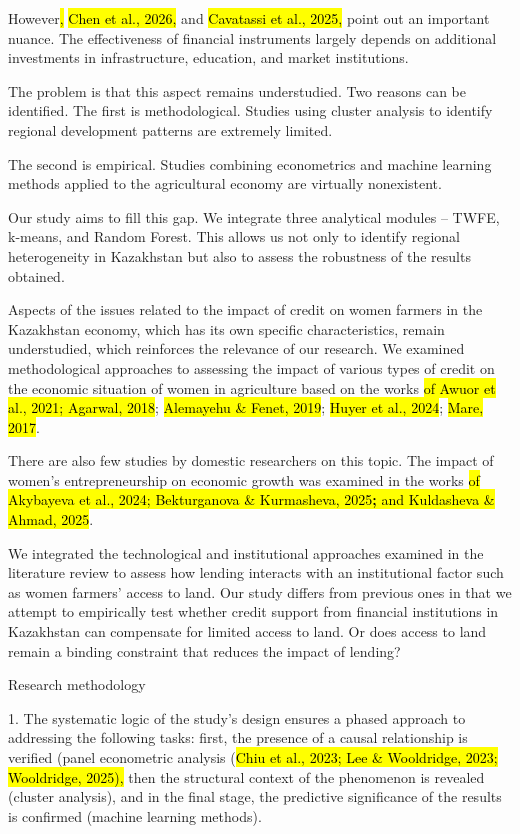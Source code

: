 However\hl{,} \hl{Chen et al., 2026,} and \hl{Cavatassi et al., 2025,}
point out an important nuance. The effectiveness of financial
instruments largely depends on additional investments in infrastructure,
education, and market institutions.

The problem is that this aspect remains understudied. Two reasons can be
identified. The first is methodological. Studies using cluster analysis
to identify regional development patterns are extremely limited.

The second is empirical. Studies combining econometrics and machine
learning methods applied to the agricultural economy are virtually
nonexistent.

Our study aims to fill this gap. We integrate three analytical modules
-- TWFE, k-means, and Random Forest. This allows us not only to identify
regional heterogeneity in Kazakhstan but also to assess the robustness
of the results obtained.

Aspects of the issues related to the impact of credit on women farmers
in the Kazakhstan economy, which has its own specific characteristics,
remain understudied, which reinforces the relevance of our research. We
examined methodological approaches to assessing the impact of various
types of credit on the economic situation of women in agriculture based
on the works \hl{of Awuor et al., 2021; Agarwal, 2018}; \hl{Alemayehu \&
Fenet, 2019}; \hl{Huyer et al., 2024}; \hl{Mare, 2017}.

There are also few studies by domestic researchers on this topic. The
impact of women's entrepreneurship on economic growth was examined in
the works \hl{of Akybayeva et al., 2024; Bekturganova \& Kurmasheva,
2025\textbf{;} and Kuldasheva \& Ahmad, 2025}.

We integrated the technological and institutional approaches examined in
the literature review to assess how lending interacts with an
institutional factor such as women farmers' access to land. Our study
differs from previous ones in that we attempt to empirically test
whether credit support from financial institutions in Kazakhstan can
compensate for limited access to land. Or does access to land remain a
binding constraint that reduces the impact of lending?

Research methodology

1. The systematic logic of the study's design ensures a phased approach
to addressing the following tasks: first, the presence of a causal
relationship is verified (panel econometric analysis (\hl{Chiu et al.,
2023; Lee \& Wooldridge, 2023; Wooldridge, 2025),} then the structural
context of the phenomenon is revealed (cluster analysis), and in the
final stage, the predictive significance of the results is confirmed
(machine learning methods).

